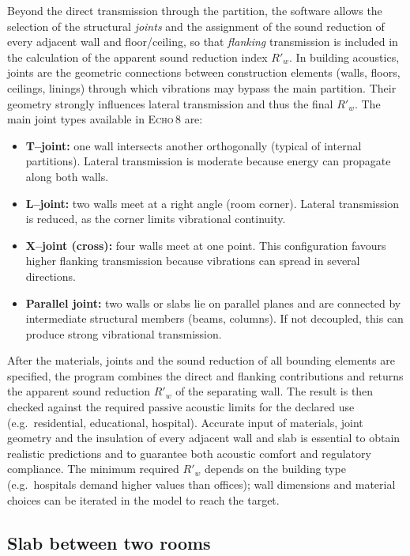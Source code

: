 Beyond the direct transmission through the partition, the software allows the selection of the structural \emph{joints} and the assignment of the sound reduction of every adjacent wall and floor/ceiling, so that \textit{flanking} transmission is included in the calculation of the apparent sound reduction index \(R'_w\). In building acoustics, joints are the geometric connections between construction elements (walls, floors, ceilings, linings) through which vibrations may bypass the main partition. Their geometry strongly influences lateral transmission and thus the final \(R'_w\). The main joint types available in \textsc{Echo\,8} are:
\begin{itemize}
  \item \textbf{T--joint:} one wall intersects another orthogonally (typical of internal partitions). Lateral transmission is moderate because energy can propagate along both walls.
  \item \textbf{L--joint:} two walls meet at a right angle (room corner). Lateral transmission is reduced, as the corner limits vibrational continuity.
  \item \textbf{X--joint (cross):} four walls meet at one point. This configuration favours higher flanking transmission because vibrations can spread in several directions.
  \item \textbf{Parallel joint:} two walls or slabs lie on parallel planes and are connected by intermediate structural members (beams, columns). If not decoupled, this can produce strong vibrational transmission.
\end{itemize}

After the materials, joints and the sound reduction of all bounding elements are specified, the program combines the direct and flanking contributions and returns the apparent sound reduction \(R'_w\) of the separating wall. The result is then checked against the required passive acoustic limits for the declared use (e.g.\ residential, educational, hospital). Accurate input of materials, joint geometry and the insulation of every adjacent wall and slab is essential to obtain realistic predictions and to guarantee both acoustic comfort and regulatory compliance. The minimum required \(R'_w\) depends on the building type (e.g.\ hospitals demand higher values than offices); wall dimensions and material choices can be iterated in the model to reach the target.


\subsection{Slab between two rooms}

